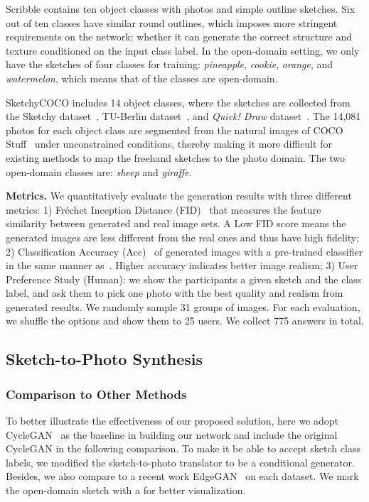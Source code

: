 \documentclass[10pt,twocolumn,letterpaper]{article}
\begin{document}
Scribble contains ten object classes with photos and simple outline sketches. Six out of ten classes have similar round outlines, which imposes more stringent requirements on the network: whether it can generate the correct structure and texture conditioned on the input class label. In the open-domain setting, we only have the sketches of four classes for training: \textit{pineapple}, \textit{cookie}, \textit{orange}, and \textit{watermelon}, which means that  of the classes are open-domain. 



SketchyCOCO includes 14 object classes, where the sketches are collected from the Sketchy dataset~\cite{sangkloy2016sketchy}, TU-Berlin dataset~\cite{eitz2012humans}, and \textit{Quick! Draw} dataset~\cite{ha2017neural}. The 14,081 photos for each object class are segmented from the natural images of COCO Stuff~\cite{caesar2018coco} under unconstrained conditions, thereby making it more difficult for existing methods to map the freehand sketches to the photo domain. The two open-domain classes are: \textit{sheep} and \textit{giraffe}. 

\noindent \textbf{Metrics.} We quantitatively evaluate the generation results with three different metrics: 1) Fr\'{e}chet Inception Distance (FID)~\cite{heusel2017gans} that measures the feature similarity between generated and real image sets. A Low FID score means the generated images are less different from the real ones and thus have high fidelity; 2) Classification Accuracy (Acc)~\cite{ashual2019specifying} of generated images with a pre-trained classifier in the same manner as~\cite{ghosh2019interactive,gao2020sketchycoco}. Higher accuracy indicates better image realism; 3) User Preference Study (Human): we show the participants a given sketch and the class label, and ask them to pick one photo with the best quality and realism from generated results. We randomly sample 31 groups of images. For each evaluation, we shuffle the options and show them to 25 users. We collect 775 answers in total.

\subsection{Sketch-to-Photo Synthesis}
\subsubsection{Comparison to Other Methods}
\label{sec:exp_comp}
To better illustrate the effectiveness of our proposed solution, here we adopt CycleGAN~\cite{zhu2017unpaired} as the baseline in building our network and include the original CycleGAN in the following comparison. To make it be able to accept sketch class labels, we modified the sketch-to-photo translator to be a conditional generator. Besides, we also compare to a recent work EdgeGAN~\cite{gao2020sketchycoco} on each dataset. We mark the open-domain sketch with a \textcolor{blue}{} for better visualization.
\end{document}
